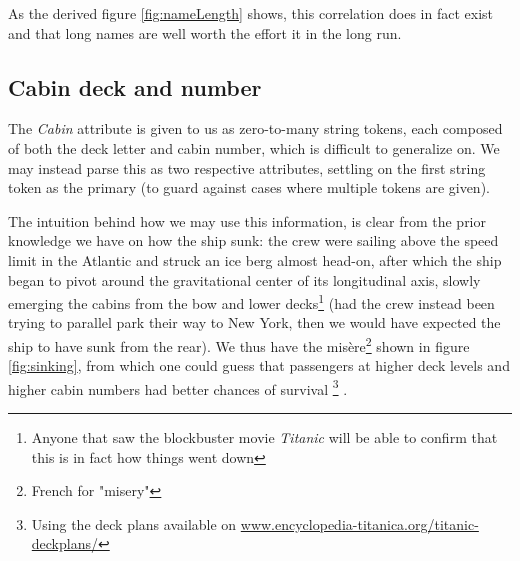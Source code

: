 \documentclass[11.5pt]{article}
\newcommand{\ti}[1] {\textit{#1}}
\newcommand{\fn}[1] {\footnote{#1}}
\begin{document}
As the derived figure \ref{fig:nameLength} shows, this correlation does in fact exist and that long names are well worth the effort it in the long run. 








\subsection*{Cabin deck and number}

The \ti{Cabin} attribute is given to us as zero-to-many string tokens, each composed of both the deck letter and cabin number, which is difficult to generalize on. We may instead parse this as two respective attributes, settling on the first string token as the primary  (to guard against  cases where multiple tokens are given). 




\def\fnDeckPlans{
\fn{Using the deck plans available on \url{www.encyclopedia-titanica.org/titanic-deckplans/}}
}



The intuition behind how we may use this information, is clear from  the prior knowledge we have on how the ship sunk: the crew were  sailing above the speed limit in the Atlantic and struck an ice berg almost head-on, after which the ship began to pivot around the gravitational center of  its longitudinal axis, slowly emerging the cabins from the bow and lower decks\fn{Anyone that saw the  blockbuster movie \ti{Titanic} will be able to confirm that this is in fact how things went down} (had the crew instead been trying to parallel park their way to New York, then we would  have expected the ship to have sunk from the rear). We thus have  the misère\fn{French for "misery"} shown in figure \ref{fig:sinking}, from which one could  guess that passengers at higher deck levels and higher cabin numbers had better chances of survival\fnDeckPlans.
\end{document}
